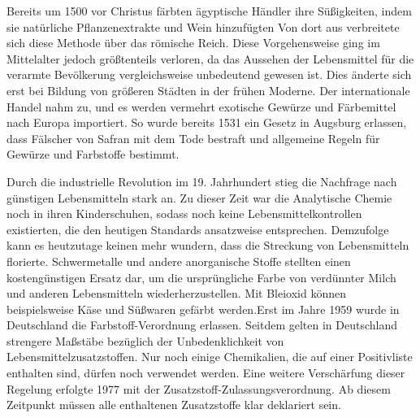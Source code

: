 \documentclass[11pt]{scrreprt}
\begin{document}
Bereits um 1500 vor Christus färbten ägyptische Händler ihre Süßigkeiten, indem sie natürliche Pflanzenextrakte und Wein hinzufügten Von dort aus verbreitete sich diese Methode über das römische Reich. Diese Vorgehensweise ging im Mittelalter jedoch größtenteils verloren, da das Aussehen der Lebensmittel für die verarmte Bevölkerung vergleichsweise unbedeutend gewesen ist\cite{HarryMeggos.1995}. Dies änderte sich erst bei Bildung von größeren Städten in der frühen Moderne. Der internationale Handel nahm zu, und es werden vermehrt exotische Gewürze und Färbemittel nach Europa importiert. So wurde bereits 1531 ein Gesetz in Augsburg erlassen, dass Fälscher von Safran mit dem Tode bestraft und allgemeine Regeln für Gewürze und Farbstoffe bestimmt.

Durch die industrielle Revolution im 19. Jahrhundert stieg die Nachfrage nach günstigen Lebensmitteln stark an. Zu dieser Zeit war die Analytische Chemie noch in ihren Kinderschuhen, sodass noch keine Lebensmittelkontrollen existierten, die den heutigen Standards ansatzweise entsprechen.  Demzufolge kann es heutzutage keinen mehr wundern, dass die Streckung von Lebensmitteln florierte. Schwermetalle und andere anorganische Stoffe stellten einen kostengünstigen Ersatz dar, um die ursprüngliche Farbe von verdünnter Milch und anderen Lebensmitteln wiederherzustellen. Mit Bleioxid können beispielsweise Käse und Süßwaren gefärbt werden\cite{Natcol.2016,Downham.2000}.Erst im Jahre 1959 wurde in Deutschland die Farbstoff-Verordnung erlassen. Seitdem gelten in Deutschland strengere Maßstäbe bezüglich der Unbedenklichkeit von Lebensmittelzusatzstoffen. Nur noch einige Chemikalien, die auf einer Positivliste enthalten sind, dürfen noch verwendet werden. Eine weitere Verschärfung dieser Regelung erfolgte 1977 mit der Zusatzstoff-Zulassungsverordnung. Ab diesem Zeitpunkt müssen alle enthaltenen Zusatzstoffe klar deklariert sein\cite[S.48-49]{Heinze.1986}.


%
\end{document}
